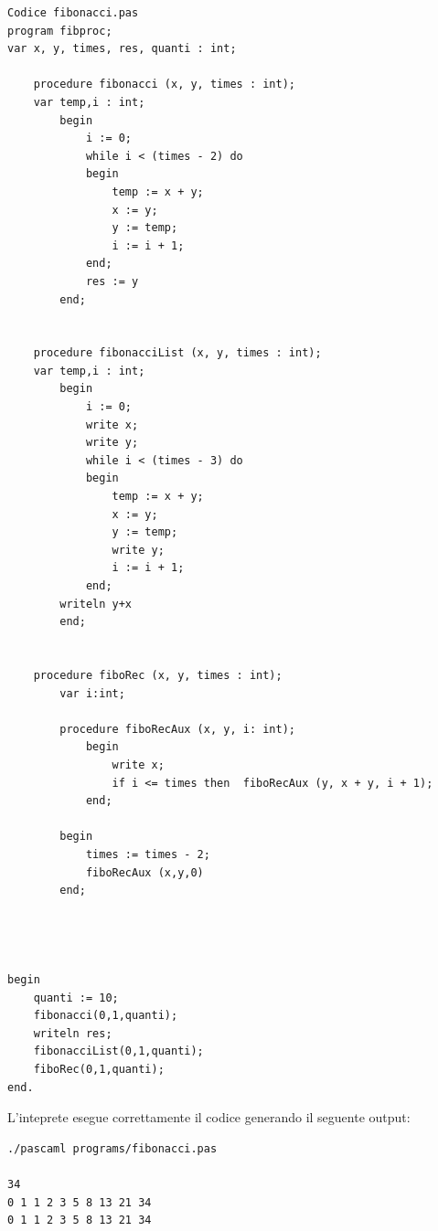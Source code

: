 \documentclass[a4paper,10pt]{article}
\begin{document}
\begin{verbatim}
Codice fibonacci.pas
program fibproc;
var x, y, times, res, quanti : int;

    procedure fibonacci (x, y, times : int);
    var temp,i : int;
        begin
            i := 0;
            while i < (times - 2) do
            begin
                temp := x + y;
                x := y;
                y := temp;
                i := i + 1;
            end;
            res := y
        end;


    procedure fibonacciList (x, y, times : int);
    var temp,i : int;
        begin
            i := 0;
            write x;
            write y;
            while i < (times - 3) do
            begin
                temp := x + y;
                x := y;
                y := temp;
                write y;
                i := i + 1;
            end;
	    writeln y+x
        end;


    procedure fiboRec (x, y, times : int);
        var i:int;

        procedure fiboRecAux (x, y, i: int);
            begin
                write x;
                if i <= times then  fiboRecAux (y, x + y, i + 1);
            end;

        begin
            times := times - 2;
            fiboRecAux (x,y,0)
        end;




begin
    quanti := 10;
    fibonacci(0,1,quanti);
    writeln res;
    fibonacciList(0,1,quanti);
    fiboRec(0,1,quanti);
end.

\end{verbatim}
L'inteprete esegue correttamente il codice generando il seguente output:
\begin{verbatim}
./pascaml programs/fibonacci.pas 

34
0 1 1 2 3 5 8 13 21 34
0 1 1 2 3 5 8 13 21 34
\end{verbatim}
\end{document}
